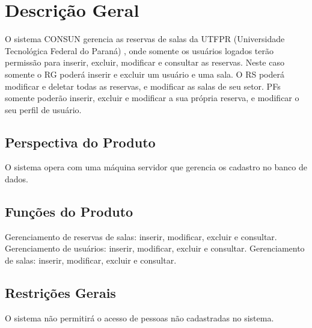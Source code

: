 \chapter{Descriç\~ao Geral}
	O sistema CONSUN gerencia as reservas de salas da UTFPR (Universidade Tecnol\'ogica Federal do Paran\'a) , onde somente os usu\'arios logados ter\~ao permiss\~ao para inserir, excluir, modificar e consultar as reservas. Neste caso somente o RG poder\'a inserir e excluir um usu\'ario e uma sala. O RS poder\'a modificar e deletar todas as reservas, e modificar as salas de seu setor. PFs somente poder\~ao inserir, excluir e modificar a sua pr\'opria reserva, e modificar o seu perfil de usu\'ario.
	
\section{Perspectiva do Produto}
	O sistema opera com uma m\'aquina servidor que gerencia os cadastro no banco de dados.
	
\section{Funç\~oes do Produto}
	Gerenciamento de reservas de salas: inserir, modificar, excluir e consultar.
	Gerenciamento de usu\'arios: inserir, modificar, excluir e consultar.
	Gerenciamento de salas: inserir, modificar, excluir e consultar.
	
\section{Restriç\~oes Gerais}
	O sistema n\~ao permitir\'a o acesso de pessoas n\~ao cadastradas no sistema.
	